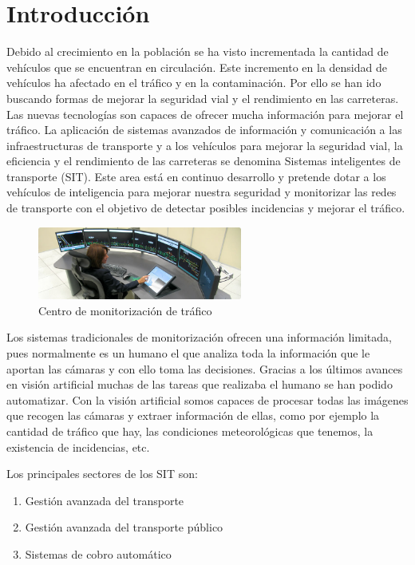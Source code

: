 \chapter{Introducción}\label{cap.introduccion}

Debido al crecimiento en la población se ha visto incrementada la cantidad de vehículos que se encuentran en circulación. Este incremento en la densidad de vehículos ha afectado en el tráfico y en la contaminación. Por ello se han ido buscando formas de mejorar la seguridad vial y el rendimiento en las carreteras. Las nuevas tecnologías son capaces de ofrecer mucha información para mejorar el tráfico. La aplicación de sistemas avanzados de información y comunicación a las infraestructuras de transporte y a los vehículos para mejorar la seguridad vial, la eficiencia y el rendimiento de las carreteras se denomina Sistemas inteligentes de transporte (SIT). Este area está en continuo desarrollo y pretende dotar a los vehículos de inteligencia para mejorar nuestra seguridad y monitorizar las redes de transporte con el objetivo de detectar posibles incidencias y mejorar el tráfico.


\begin{figure}[H]
  \begin{center}
    \includegraphics[width=0.6\textwidth]{figures/Introduccion/Indra.jpg}
		\caption{Centro de monitorización de tráfico}
		\label{fig.monitorizacion}
		\end{center}
\end{figure}

Los sistemas tradicionales de monitorización ofrecen una información limitada, pues normalmente es un humano el que analiza toda la información que le aportan las cámaras y con ello toma las decisiones. Gracias a los últimos avances en visión artificial muchas de las tareas que realizaba el humano se han podido automatizar. Con la visión artificial somos capaces de procesar todas las imágenes que recogen las cámaras y extraer información de ellas, como por ejemplo la cantidad de tráfico que hay, las condiciones meteorológicas que tenemos, la existencia de incidencias, etc.

Los principales sectores de los SIT son:
\begin{enumerate}
    \item Gestión avanzada del transporte
    \item Gestión avanzada del transporte público
    \item Sistemas de cobro automático
\end{enumerate}

